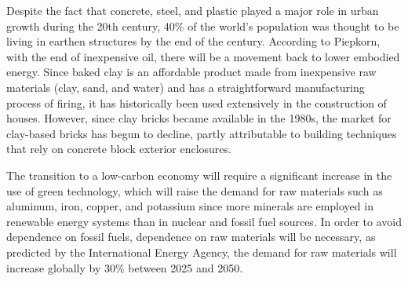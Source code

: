 Despite the fact that concrete, steel, and plastic played a major role in urban growth during the 20th century, 40\% of the world's population was thought to be living in earthen structures by the end of the century.\autocite{houben1994earth} According to Piepkorn, with the end of inexpensive oil, there will be a movement back to lower embodied energy.\autocite{piepkorn2005natural} Since baked clay is an affordable product made from inexpensive raw materials (clay, sand, and water) and has a straightforward manufacturing process of firing, it has historically been used extensively in the construction of houses. However, since clay bricks became available in the 1980s, the market for clay-based bricks has begun to decline, partly attributable to building techniques that rely on concrete block exterior enclosures.\autocite{lozano2018comparative}

The transition to a low-carbon economy will require a significant increase in the use of green technology, which will raise the demand for raw materials such as aluminum, iron, copper, and potassium since more minerals are employed in renewable energy systems than in nuclear and fossil fuel sources.\autocite{sonderegger2020mineral} In order to avoid dependence on fossil fuels, dependence on raw materials will be necessary, as predicted by the International Energy Agency, the demand for raw materials will increase globally by 30\% between 2025 and 2050.\autocite{valero2018global}




